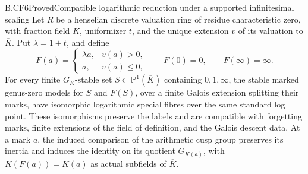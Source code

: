 \begin{claim}{B.CF6}{Proved}{Compatible logarithmic reduction under a supported infinitesimal scaling}
Let \(R\) be a henselian discrete valuation ring of residue
characteristic zero, with fraction field \(K\), uniformizer \(t\),
and the unique extension \(v\) of its valuation to \(\overline K\).
Put \(\lambda=1+t\), and define
\[
 F(a)=
 \begin{cases}
   \lambda a,&v(a)>0,\\
   a,&v(a)\leq0,
 \end{cases}
 \qquad F(0)=0,
 \qquad F(\infty)=\infty.                                \tag{B.CF.12}
\]
For every finite \(G_K\)-stable set \(S\subset\mathbb P^1(\overline K)\)
containing \(0,1,\infty\), the stable marked genus-zero models for
\(S\) and \(F(S)\), over a finite Galois extension splitting their
marks, have isomorphic logarithmic special fibres over the same
standard log point. These isomorphisms preserve the labels and are
compatible with forgetting marks, finite extensions of the field of
definition, and the Galois descent data. At a mark \(a\), the induced
comparison of the arithmetic cusp group preserves its inertia and
induces the identity on its quotient \(G_{K(a)}\), with
\(K(F(a))=K(a)\) as actual subfields of \(\overline K\).
\end{claim}
